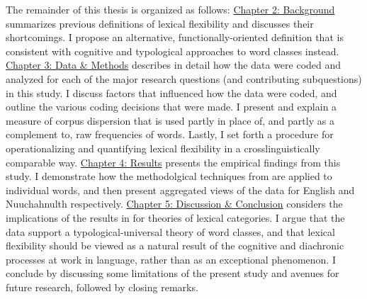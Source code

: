 The remainder of this thesis is organized as follows: \hyperref[ch:background]{Chapter 2: Background} summarizes previous definitions of lexical flexibility and discusses their shortcomings. I propose an alternative, functionally-oriented definition that is consistent with cognitive and typological approaches to word classes instead. \hyperref[ch:background]{Chapter 3: Data \& Methods} describes in detail how the data were coded and analyzed for each of the major research questions (and contributing subquestions) in this study. I discuss factors that influenced how the data were coded, and outline the various coding decisions that were made. I present and explain a measure of corpus dispersion that is used partly in place of, and partly as a complement to, raw frequencies of words. Lastly, I set forth a procedure for operationalizing and quantifying lexical flexibility in a crosslinguistically comparable way. \hyperref[ch:background]{Chapter 4: Results} presents the empirical findings from this study. I demonstrate how the methodolgical techniques from  are applied to individual words, and then present aggregated views of the data for English and Nuuchahnulth respectively. \hyperref[ch:background]{Chapter 5: Discussion \& Conclusion} considers the implications of the results in  for theories of lexical categories. I argue that the data support a typological-universal theory of word classes, and that lexical flexibility should be viewed as a natural result of the cognitive and diachronic processes at work in language, rather than as an exceptional phenomenon. I conclude by discussing some limitations of the present study and avenues for future research, followed by closing remarks.
